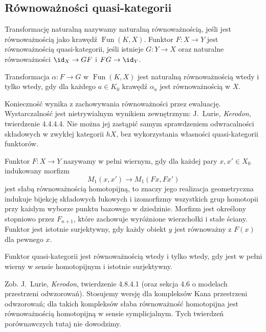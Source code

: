 \subsection{Równoważności quasi-kategorii}

\begin{definicja}\label{cat:def:quasicat-functor-equivalence}
Transformację naturalną nazywamy naturalną równoważnością, jeśli jest równoważnością jako krawędź $\operatorname{Fun}(K,X)$. Funktor $F:X\to Y$ jest równoważnością quasi-kategorii, jeśli istnieje $G:Y\to X$ oraz naturalne równoważności $\id_X\to GF$ i $FG\to\id_Y$.
\end{definicja}

\begin{twierdzenie}\label{cat:thm:quasicat-pointwise-equivalence}
Transformacja $\alpha:F\to G$ w $\operatorname{Fun}(K,X)$ jest naturalną równoważnością wtedy i tylko wtedy, gdy dla każdego $a\in K_0$ krawędź $\alpha_a$ jest równoważnością w $X$.
\end{twierdzenie}
Konieczność wynika z zachowywania równoważności przez ewaluację. Wystarczalność jest nietrywialnym wynikiem zewnętrznym: J.~Lurie, \emph{Kerodon}, twierdzenie 4.4.4.4. Nie można jej zastąpić samym sprawdzeniem odwracalności składowych w zwykłej kategorii $hX$, bez wykorzystania własności quasi-kategorii funktorów.

\begin{definicja}\label{cat:def:quasicat-fully-faithful}
Funktor $F:X\to Y$ nazywamy w pełni wiernym, gdy dla każdej pary $x,x'\in X_0$ indukowany morfizm
\[
 M_1(x,x')\longrightarrow M_1(Fx,Fx')
\]
jest słabą równoważnością homotopijną, to znaczy jego realizacja geometryczna indukuje bijekcję składowych łukowych i izomorfizmy wszystkich grup homotopii przy każdym wyborze punktu bazowego w dziedzinie. Morfizm jest określony stopniowo przez $F_{n+1}$, które zachowuje wyróżnione wierzchołki i stałe ściany. Funktor jest istotnie surjektywny, gdy każdy obiekt $y$ jest równoważny z $F(x)$ dla pewnego $x$.
\end{definicja}

\begin{twierdzenie}\label{cat:thm:quasicat-equivalence-criterion}
Funktor quasi-kategorii jest równoważnością wtedy i tylko wtedy, gdy jest w pełni wierny w sensie homotopijnym i istotnie surjektywny.
\end{twierdzenie}
Zob. J.~Lurie, \emph{Kerodon}, twierdzenie 4.8.4.1 (oraz sekcja 4.6 o modelach przestrzeni odwzorowań). Stosujemy wersję dla kompleksów Kana przestrzeni odwzorowań; dla takich kompleksów słaba równoważność homotopijna jest równoważnością homotopijną w sensie symplicjalnym. Tych twierdzeń porównawczych tutaj nie dowodzimy.

